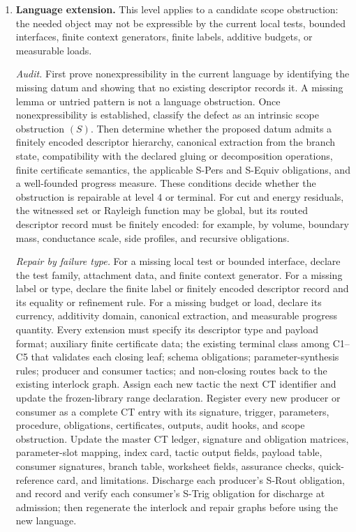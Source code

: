\documentclass[
  11pt,
]{article}
\theoremstyle{definition}
\begin{document}
\begin{enumerate}
  \emph{Exit test.} Every outcome of the new pattern must close at
  C1--C5 or enter an existing consumer through a typed payload, and every
  loop must decrease the declared measure. If the pattern cannot be
  stated using the current descriptor types, the obstruction moves to
  level 4.
\item
  \textbf{Language extension.} This level applies to a candidate scope
  obstruction: the needed object may not be expressible by the current
  local tests, bounded interfaces, finite context generators, finite
  labels, additive budgets, or measurable loads.

  \emph{Audit.} First prove nonexpressibility in the current language by
  identifying the missing datum and showing that no existing descriptor
  records it. A missing lemma or untried pattern is not a language
  obstruction. Once nonexpressibility is established, classify the
  defect as an intrinsic scope obstruction \((S)\). Then determine
  whether the proposed datum admits a finitely encoded descriptor
  hierarchy, canonical extraction from the branch state,
  compatibility with the declared gluing or decomposition operations,
  finite certificate semantics, the applicable S-Pers and S-Equiv
  obligations, and a well-founded progress measure. These conditions
  decide whether the obstruction is repairable at level 4 or terminal.
  For cut and energy residuals, the witnessed set or Rayleigh function
  may be global, but its routed descriptor record must be finitely
  encoded: for example, by volume, boundary mass, conductance scale, side
  profiles, and recursive obligations.

  \emph{Repair by failure type.} For a missing local test or bounded
  interface, declare the test family, attachment data, and finite context
  generator. For a missing label or type, declare the finite label or
  finitely encoded descriptor record and its equality or refinement
  rule. For a missing budget or load,
  declare its currency, additivity domain, canonical extraction, and
  measurable progress quantity. Every extension must specify its
  descriptor type and payload format; auxiliary finite certificate data;
  the existing terminal class among C1--C5 that validates each closing
  leaf; schema obligations; parameter-synthesis rules; producer and
  consumer tactics; and non-closing routes back to the existing interlock
  graph. Assign each new tactic the next CT identifier and update the
  frozen-library range declaration. Register every new producer or
  consumer as a complete CT entry with its signature, trigger, parameters,
  procedure,
  obligations, certificates, outputs, audit hooks, and scope obstruction.
  Update the master CT ledger, signature and obligation matrices,
  parameter-slot mapping, index card, tactic output fields, payload
  table, consumer signatures, branch table, worksheet fields, assurance
  checks, quick-reference card, and limitations.
  Discharge each producer's S-Rout obligation, and record and verify each consumer's
  S-Trig obligation for discharge at admission; then regenerate the
  interlock and repair graphs before using the new language.


\end{enumerate}
\end{document}
